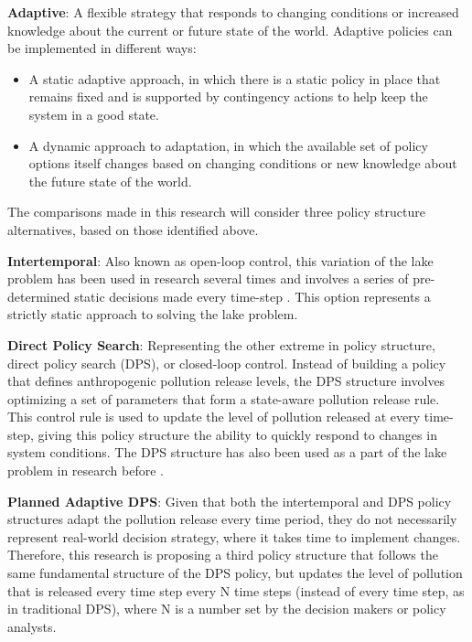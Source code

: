     \textbf{Adaptive}: A flexible strategy that responds to changing conditions or increased knowledge about the current or future state of the world. Adaptive policies can be implemented in different ways: 
    \begin{itemize}
        \item A static adaptive approach, in which there is a static policy in place that remains fixed and is supported by contingency actions to help keep the system in a good state. 
        \item A dynamic approach to adaptation, in which the available set of policy options itself changes based on changing conditions or new knowledge about the future state of the world. 
    \end{itemize}

    The comparisons made in this research will consider three policy structure alternatives, based on those identified above.

    \textbf{Intertemporal}: Also known as open-loop control, this variation of the lake problem has been used in research several times and involves a series of pre-determined static decisions made every time-step \citep{Hadka2015,Quinn2017,Singh2015,Ward2015}. This option represents a strictly static approach to solving the lake problem. 

    \textbf{Direct Policy Search}: Representing the other extreme in policy structure, direct policy search (DPS), or closed-loop control. Instead of building a policy that defines anthropogenic pollution release levels, the DPS structure involves optimizing a set of parameters that form a state-aware pollution release rule. This control rule is used to update the level of pollution released at every time-step, giving this policy structure the ability to quickly respond to changes in system conditions. The DPS structure has also been used as a part of the lake problem in research before \citep{Quinn2017}. 
    
    \textbf{Planned Adaptive DPS}: Given that both the intertemporal and DPS policy structures adapt the pollution release every time period, they do not necessarily represent real-world decision strategy, where it takes time to implement changes. Therefore, this research is proposing a third policy structure that follows the same fundamental structure of the DPS policy, but updates the level of pollution that is released every time step every N time steps (instead of every time step, as in traditional DPS), where N is a number set by the decision makers or policy analysts. 
